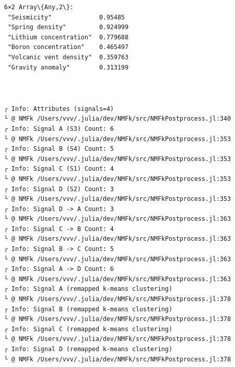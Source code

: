 \documentclass[11pt]{article}
\begin{document}
    \begin{Verbatim}[commandchars=\\\{\}]
6×2 Array\{Any,2\}:
 "Seismicity"             0.95485
 "Spring density"         0.924999
 "Lithium concentration"  0.779688
 "Boron concentration"    0.465497
 "Volcanic vent density"  0.359763
 "Gravity anomaly"        0.313199
    \end{Verbatim}


    \begin{center}
    \end{center}
    { \hspace*{\fill} \\}

    \begin{Verbatim}[commandchars=\\\{\}]

    \end{Verbatim}

    \begin{Verbatim}[commandchars=\\\{\}]
┌ Info: Attributes (signals=4)
└ @ NMFk /Users/vvv/.julia/dev/NMFk/src/NMFkPostprocess.jl:340
┌ Info: Signal A (S3) Count: 6
└ @ NMFk /Users/vvv/.julia/dev/NMFk/src/NMFkPostprocess.jl:353
┌ Info: Signal B (S4) Count: 5
└ @ NMFk /Users/vvv/.julia/dev/NMFk/src/NMFkPostprocess.jl:353
┌ Info: Signal C (S1) Count: 4
└ @ NMFk /Users/vvv/.julia/dev/NMFk/src/NMFkPostprocess.jl:353
┌ Info: Signal D (S2) Count: 3
└ @ NMFk /Users/vvv/.julia/dev/NMFk/src/NMFkPostprocess.jl:353
┌ Info: Signal D -> A Count: 3
└ @ NMFk /Users/vvv/.julia/dev/NMFk/src/NMFkPostprocess.jl:363
┌ Info: Signal C -> B Count: 4
└ @ NMFk /Users/vvv/.julia/dev/NMFk/src/NMFkPostprocess.jl:363
┌ Info: Signal B -> C Count: 5
└ @ NMFk /Users/vvv/.julia/dev/NMFk/src/NMFkPostprocess.jl:363
┌ Info: Signal A -> D Count: 6
└ @ NMFk /Users/vvv/.julia/dev/NMFk/src/NMFkPostprocess.jl:363
┌ Info: Signal A (remapped k-means clustering)
└ @ NMFk /Users/vvv/.julia/dev/NMFk/src/NMFkPostprocess.jl:378
┌ Info: Signal B (remapped k-means clustering)
└ @ NMFk /Users/vvv/.julia/dev/NMFk/src/NMFkPostprocess.jl:378
┌ Info: Signal C (remapped k-means clustering)
└ @ NMFk /Users/vvv/.julia/dev/NMFk/src/NMFkPostprocess.jl:378
┌ Info: Signal D (remapped k-means clustering)
└ @ NMFk /Users/vvv/.julia/dev/NMFk/src/NMFkPostprocess.jl:378
    \end{Verbatim}

    \begin{center}
    \end{center}
    { \hspace*{\fill} \\}
\end{document}

